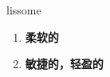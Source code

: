 
\begin{frame}
{\huge lissome}
\begin{center}
\begin{enumerate}\Large
  \item \textbf{柔软的}
  \item \textbf{敏捷的，轻盈的}
\end{enumerate}
\end{center}
\end{frame}
